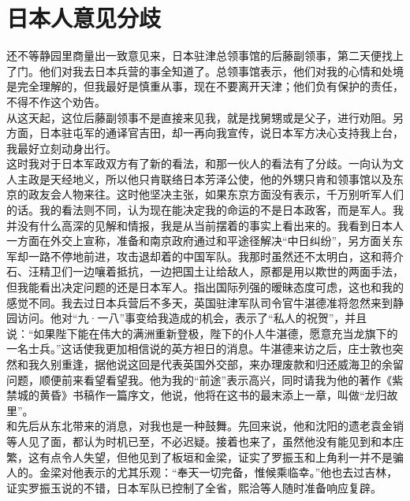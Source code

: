 \fancyhead[RO]{} %
\fancyhead[LE]{} %
\chapter*{日本人意见分歧}
\thispagestyle{empty}
还不等静园里商量出一致意见来，日本驻津总领事馆的后藤副领事，第二天便找上了门。他们对我去日本兵营的事全知道了。总领事馆表示，他们对我的心情和处境是完全理解的，但我最好是慎重从事，现在不要离开天津；他们负有保护的责任，不得不作这个劝告。\\

从这天起，这位后藤副领事不是直接来见我，就是找舅甥或是父子，进行劝阻。另方面，日本驻屯军的通译官吉田，却一再向我宣传，说日本军方决心支持我上台，我最好立刻动身出行。\\

这时我对于日本军政双方有了新的看法，和那一伙人的看法有了分歧。一向认为文人主政是天经地义，所以他只肯联络日本芳泽公使，他的外甥只肯和领事馆以及东京的政友会人物来往。这时他坚决主张，如果东京方面没有表示，千万别听军人们的话。我的看法则不同，认为现在能决定我的命运的不是日本政客，而是军人。我并没有什么高深的见解和情报，我是从当前摆着的事实上看出来的。我看到日本人一方面在外交上宣称，准备和南京政府通过和平途径解决“中日纠纷”，另方面关东军却一路不停地前进，攻击退却着的中国军队。我那时虽然还不太明白，这和蒋介石、汪精卫们一边嚷着抵抗，一边把国土让给敌人，原都是用以欺世的两面手法，但我能看出决定问题的还是日本军人。指出国际列强的暧昧态度可虑，这也和我的感觉不同。我去过日本兵营后不多天，英国驻津军队司令官牛湛德准将忽然来到静园访问。他对“九·一八”事变给我造成的机会，表示了“私人的祝贺”，并且说：“如果陛下能在伟大的满洲重新登极，陛下的仆人牛湛德，愿意充当龙旗下的一名士兵。”这话使我更加相信说的英方袒日的消息。牛湛德来访之后，庄士敦也突然和我久别重逢，据他说这回是代表英国外交部，来办理废款和归还威海卫的余留问题，顺便前来看望看望我。他为我的“前途”表示高兴，同时请我为他的著作《紫禁城的黄昏》书稿作一篇序文，他说，他将在这书的最末添上一章，叫做“龙归故里”。\\

和先后从东北带来的消息，对我也是一种鼓舞。先回来说，他和沈阳的遗老袁金销等人见了面，都认为时机已至，不必迟疑。接着也来了，虽然他没有能见到和本庄繁，这有点令人失望，但他见到了板垣和金梁，证实了罗振玉和上角利一并不是骗人的。金梁对他表示的尤其乐观：“奉天一切完备，惟候乘临幸。”他也去过吉林，证实罗振玉说的不错，日本军队已控制了全省，熙洽等人随时准备响应复辟。\\

